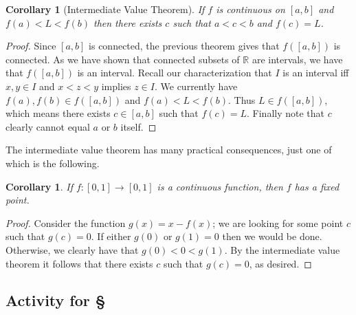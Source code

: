 \documentclass[11pt,oneside]{amsbook}
\newcommand{\R}{\mathbb R}
\theoremstyle{definition}
\theoremstyle{plain}
\newtheorem{corollary}[theorem]{Corollary}
\theoremstyle{definition}
\theoremstyle{remark}
\numberwithin{equation}{section}
\numberwithin{figure}{section}
\begin{document}
\begin{corollary}[Intermediate Value Theorem]
  If $f$ is continuous on $[a,b]$ and $f(a)<L<f(b)$ then there exists $c$ such that $a<c<b$ and $f(c)=L$.
\end{corollary}

\begin{proof}
  Since $[a,b]$ is connected, the previous theorem gives that $f([a,b])$ is connected. As we have shown that connected subsets of $\R$ are intervals, we have that $f([a,b])$ is an interval. Recall our characterization that $I$ is an interval iff $x,y\in I$ and $x<z<y$ implies $z\in I$. We currently have $f(a),f(b)\in f([a,b])$ and $f(a)<L<f(b)$. Thus $L\in f([a,b])$, which means there exists $c\in[a,b]$ such that $f(c)=L$. Finally note that $c$ clearly cannot equal $a$ or $b$ itself.
\end{proof}

The intermediate value theorem has many practical consequences, just one of which is the following.

\begin{corollary}
  If $f\colon[0,1]\to[0,1]$ is a continuous function, then $f$ has a fixed point.
\end{corollary}

\begin{proof}
  Consider the function $g(x)=x-f(x)$; we are looking for some point $c$ such that $g(c)=0$. If either $g(0)$ or $g(1)=0$ then we would be done. Otherwise, we clearly have that $g(0)<0<g(1)$. By the intermediate value theorem it follows that there exists $c$ such that $g(c)=0$, as desired.
\end{proof}

\newpage
\subsection*{Activity for \S \thesection}
\end{document}
